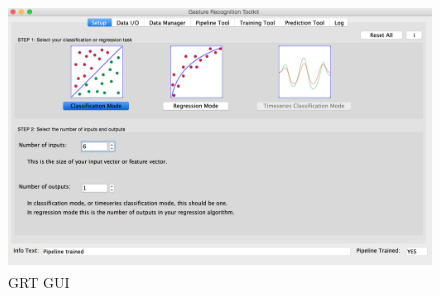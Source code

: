 \begin{figure}
	[h] \centering 
	\includegraphics[height=7cm]{figures/content/grt-gui.png} \caption{GRT GUI} \label{fg:grt:gui} 
\end{figure}
